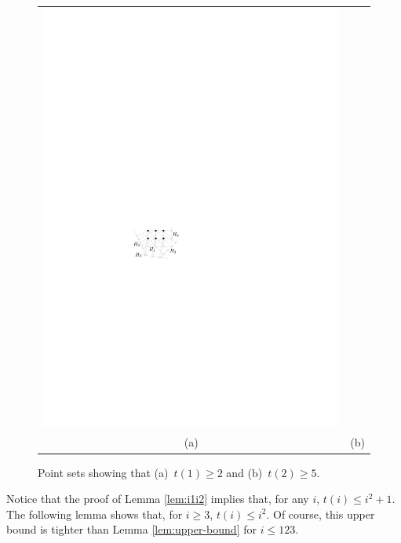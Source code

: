 \documentclass{ws-ijcga}
\begin{document}
\begin{figure}
\begin{tabular}{cc}
      \includegraphics{i2.pdf} \\
     (a) \hspace{5mm}  & \hspace{5mm}  (b)
  \end{tabular}
  \caption{Point sets showing that (a)~$t(1) \ge 2$ and (b)~$t(2) \ge 5$.}
  \label{fig:i1i2}
\end{figure}

Notice that the proof of Lemma \ref{lem:i1i2} implies that, for any $i$, 
$t(i)\le i^2 + 1$.  The following lemma shows that, for $i\ge 3$, $t(i)\le i^2$.  Of course, this upper bound is tighter than Lemma \ref{lem:upper-bound} for $i\le 123$.
\end{document}
